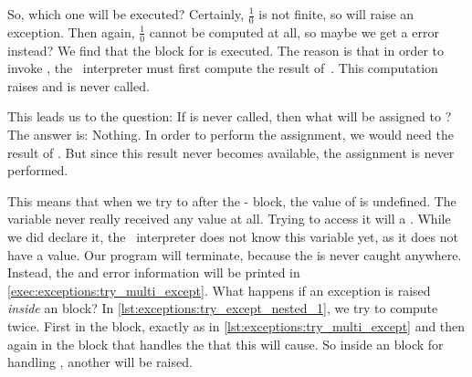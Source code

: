 So, which one will be executed?
Certainly, $\frac{1}{0}$ is not finite, so  will raise an exception.
Then again, $\frac{1}{0}$ cannot be computed at all, so maybe we get a  error instead?
We find that the  block for  is executed.
The reason is that in order to invoke , the \python\ interpreter must first compute the result of~.
This computation raises  and  is never called.

This leads us to the question:
If  is never called, then what will be assigned to ?
The answer is: Nothing.
In order to perform the assignment, we would need the result of .
But since this result never becomes available, the assignment is never performed.

This means that when we try to  after the - block, the value of  is undefined.
The variable  never really received any value at all.
Trying to access it will  a .
While we did declare it, the \python\ interpreter does not know this variable yet, as it does not have a value.
Our program will terminate, because the  is never caught anywhere.
Instead, the  and error information will be printed in \cref{exec:exceptions:try_multi_except}.%
%
%
%
\FloatBarrier%
\endhsection%
%
%
%
%
%
What happens if an exception is raised \emph{inside} an  block?
In \cref{lst:exceptions:try_except_nested_1}, we try to compute  twice.
First in the  block, exactly as in \cref{lst:exceptions:try_multi_except} and then again in the  block that handles the  that this will cause.
So inside an  block for handling , another  will be raised.

